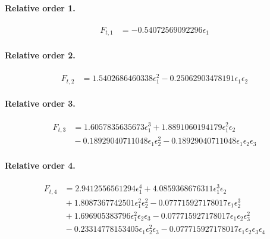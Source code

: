 \documentclass[10pt]{article}
\begin{document}
\paragraph{Relative order 1.}
\begin{align*}
F_{t,1} &=  - 0.54072569092296 \epsilon_{1}
\end{align*}

\paragraph{Relative order 2.}
\begin{align*}
F_{t,2} &= 1.5402686460338 \epsilon_{1}^{2} - 0.25062903478191 \epsilon_{1} \epsilon_{2}
\end{align*}

\paragraph{Relative order 3.}
\begin{align*}
F_{t,3} &= 1.6057835635673 \epsilon_{1}^{3} + 1.8891060194179 \epsilon_{1}^{2} \epsilon_{2} \\
&{}  - 0.18929040711048 \epsilon_{1} \epsilon_{2}^{2} - 0.18929040711048 \epsilon_{1} \epsilon_{2} \epsilon_{3}
\end{align*}

\paragraph{Relative order 4.}
\begin{align*}
F_{t,4} &= 2.9412556561294 \epsilon_{1}^{4} + 4.0859368676311 \epsilon_{1}^{3} \epsilon_{2} \\
&{}  + 1.8087367742501 \epsilon_{1}^{2} \epsilon_{2}^{2} - 0.077715927178017 \epsilon_{1} \epsilon_{2}^{3} \\
&{}  + 1.696905383796 \epsilon_{1}^{2} \epsilon_{2} \epsilon_{3} - 0.077715927178017 \epsilon_{1} \epsilon_{2} \epsilon_{3}^{2} \\
&{}  - 0.23314778153405 \epsilon_{1} \epsilon_{2}^{2} \epsilon_{3} - 0.077715927178017 \epsilon_{1} \epsilon_{2} \epsilon_{3} \epsilon_{4}
\end{align*}
\end{document}
